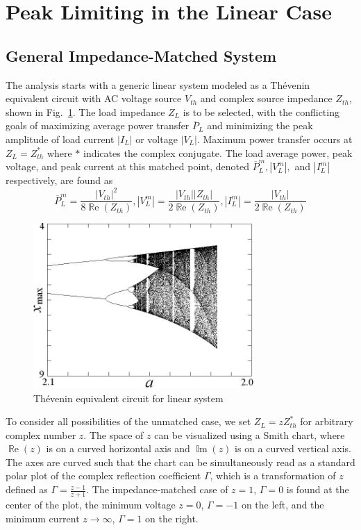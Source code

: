 \documentclass{ifacconf}
\renewcommand{\Re}{\operatorname{\mathbb{R}e}}
\renewcommand{\Im}{\operatorname{\mathbb{I}m}}
\begin{document}
\section{Peak Limiting in the Linear Case}\label{sec:linear}
\subsection{General Impedance-Matched System}
The analysis starts with a generic linear system modeled as a Thévenin equivalent circuit with AC voltage source $V_{th}$ and complex source impedance $Z_{th}$, shown in Fig.~\ref{fig:circuit}. The load impedance $Z_L$ is to be selected, with the conflicting goals of maximizing average power transfer $\overline{P}_L$ and minimizing the peak amplitude of load current $|I_L|$ or voltage $|V_L|$. Maximum power transfer occurs at $Z_L = Z_{th}^*$ where $*$ indicates the complex conjugate. The load average power, peak voltage, and peak current at this matched point, denoted $\overline{P}_L^m, |V_L^m|,$ and $|I_L^m|$ respectively, are found as
\begin{equation}
    \overline{P}_L^m = \frac{|V_{th}|^2}{8 \Re(Z_{th})}, 
    |V_L^m| = \frac{|V_{th}| |Z_{th}|} {2 \Re(Z_{th})}, 
    |I_L^m| = \frac{|V_{th}|}{2 \Re(Z_{th})}
\end{equation}

\begin{figure}
\begin{center}
\includegraphics[width=8.4cm]{bifurcation}    %
\caption{Thévenin equivalent circuit for linear system} 
\label{fig:circuit}
\end{center}
\end{figure}

To consider all possibilities of the unmatched case, we set $Z_L = z Z_{th}^*$ for arbitrary complex number $z$. The space of $z$ can be visualized using a Smith chart, where $\Re(z)$ is on a curved horizontal axis and $\Im(z)$ is on a curved vertical axis. The axes are curved such that the chart can be simultaneously read as a standard polar plot of the complex reflection coefficient $\Gamma$, which is a transformation of $z$ defined as $\Gamma = \frac{z-1}{z+1}$. The impedance-matched case of $z=1$, $\Gamma = 0$ is found at the center of the plot, the minimum voltage $z=0$, $\Gamma = -1$ on the left, and the minimum current $z \rightarrow \infty$, $\Gamma = 1$ on the right.
\end{document}
